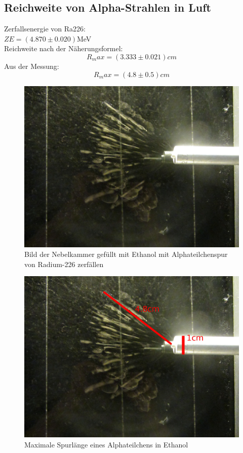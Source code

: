 \documentclass[12pt,a4paper]{article}
\begin{document}
\begin{multicols}{2}
\subsection{Reichweite von Alpha-Strahlen in Luft}

Zerfallsenergie von Ra226: \\
$ZE = (4.870 \pm 0.020)$MeV\\
Reichweite nach der Näherungsformel:
$$R_max =(3.333 \pm 0.021)cm$$
Aus der Messung:
$$R_max = (4.8 \pm 0.5)cm$$

\begin{figure}[H]
	\centering
	\includegraphics[scale=0.055]{./figures/alpha_auswertung.JPG}
	\caption{Bild der Nebelkammer gefüllt mit Ethanol mit Alphateilchenspur von Radium-226 zerfällen}
	\label{fig:roh_nebel_erg}
\end{figure}

\begin{figure}[H]
	\centering
	\includegraphics[scale=0.13]{./figures/radium226_ethanol_nebelspur.jpg}
	\caption{Maximale Spurlänge eines Alphateilchens in Ethanol}
	\label{fig:ausw_nebel_erg}
\end{figure}


\end{multicols}
\end{document}
